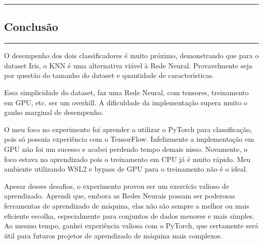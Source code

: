 {\color{gray}\hrule}
\begin{center}
\section{Conclusão}
\end{center}
{\color{gray}\hrule}
\vspace{0.5cm}
O desempenho dos dois classificadores é muito próximo, demonstrando que para o dataset Iris, o KNN é uma alternativa viável à Rede Neural.
Provavelmente seja por questão do tamanho do dataset e quantidade de características.

Essa simplicidade do dataset, faz uma Rede Neural, com tensores, treinamento em GPU, etc. ser um overkill. A dificuldade da implementação supera muito o ganho marginal de desempenho.

O meu foco no experimento foi aprender a utilizar o PyTorch para classificação, pois só possuia experiência com o TensorFlow. Infelizmente a implementação em GPU não foi um sucesso e acabei perdendo tempo demais nisso.
Novamente, o foco estava no aprendizado pois o treinamento em CPU já é muito rápido. Meu ambiente utilizando WSL2 e bypass de GPU para o treinamento não é o ideal.

Apesar desses desafios, o experimento provou ser um exercício valioso de aprendizado.
Aprendi que, embora as Redes Neurais possam ser poderosas ferramentas de aprendizado de máquina, elas não são sempre a melhor ou mais eficiente escolha, 
especialmente para conjuntos de dados menores e mais simples. Ao mesmo tempo, ganhei experiência valiosa com o PyTorch, que certamente será útil para futuros projetos de aprendizado de máquina mais complexos.